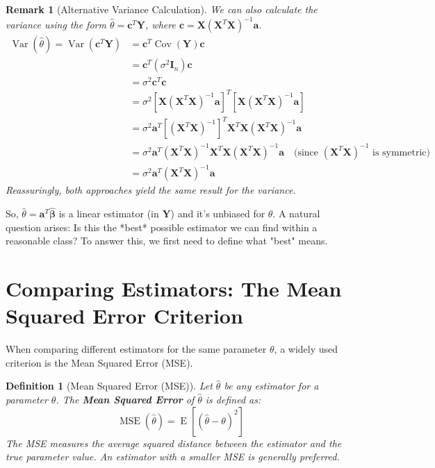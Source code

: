\documentclass[11pt]{article}
\theoremstyle{mytheoremstyle}
\theoremstyle{mydefinitionstyle}
\newtheorem{definition}[theorem]{Definition}
\newtheorem{remark}[theorem]{Remark}
\newcommand{\vect}[1]{\mathbf{#1}}
\DeclareMathOperator{\E}{E}
\DeclareMathOperator{\Var}{Var}
\DeclareMathOperator{\Cov}{Cov}
\DeclareMathOperator{\MSE}{MSE}
\begin{document}
\begin{remark}[Alternative Variance Calculation]
We can also calculate the variance using the form $\hat{\theta} = \vect{c}^T \vect{Y}$, where $\vect{c} = \vect{X} (\vect{X}^T \vect{X})^{-1} \vect{a}$.
\begin{align*}
\Var(\hat{\theta}) = \Var(\vect{c}^T \vect{Y}) &= \vect{c}^T \Cov(\vect{Y}) \vect{c} \\
&= \vect{c}^T (\sigma^2 \vect{I}_n) \vect{c} \\
&= \sigma^2 \vect{c}^T \vect{c} \\
&= \sigma^2 [\vect{X} (\vect{X}^T \vect{X})^{-1} \vect{a}]^T [\vect{X} (\vect{X}^T \vect{X})^{-1} \vect{a}] \\
&= \sigma^2 \vect{a}^T [(\vect{X}^T \vect{X})^{-1}]^T \vect{X}^T \vect{X} (\vect{X}^T \vect{X})^{-1} \vect{a} \\
&= \sigma^2 \vect{a}^T (\vect{X}^T \vect{X})^{-1} \vect{X}^T \vect{X} (\vect{X}^T \vect{X})^{-1} \vect{a} \quad \text{(since } (\vect{X}^T \vect{X})^{-1} \text{ is symmetric)} \\
&= \sigma^2 \vect{a}^T (\vect{X}^T \vect{X})^{-1} \vect{a}
\end{align*}
Reassuringly, both approaches yield the same result for the variance.
\end{remark}

So, $\hat{\theta} = \vect{a}^T \hat{\vect{\beta}}$ is a linear estimator (in $\vect{Y}$) and it's unbiased for $\theta$. A natural question arises: Is this the *best* possible estimator we can find within a reasonable class? To answer this, we first need to define what "best" means.

\section{Comparing Estimators: The Mean Squared Error Criterion}

When comparing different estimators for the same parameter $\theta$, a widely used criterion is the Mean Squared Error (MSE).

\begin{definition}[Mean Squared Error (MSE)]
Let $\hat{\theta}$ be any estimator for a parameter $\theta$. The \textbf{Mean Squared Error} of $\hat{\theta}$ is defined as:
\begin{equation*}
\MSE(\hat{\theta}) = \E[(\hat{\theta} - \theta)^2]
\end{equation*}
The MSE measures the average squared distance between the estimator and the true parameter value. An estimator with a smaller MSE is generally preferred.
\end{definition}
\end{document}
